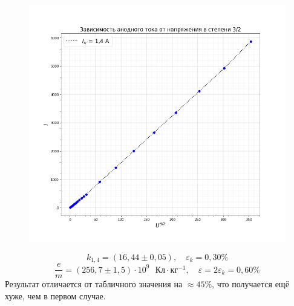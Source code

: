 \documentclass[a4paper,12pt]{article}
\begin{document}
\begin{figure}[H]\label{fig: I)(U^3/2) 1.4}
    \centering
    \includegraphics[width = \textwidth]{I(U pow (1,5))_14.png}
\end{figure}
\[k_{1,4} = (16,44 \pm 0,05), \quad \varepsilon_k = 0,30\% \]
\[\frac{e}{m} = (256,7 \pm 1,5) \cdot 10^{9} \text{ } Кл \cdot кг^{-1}, \quad \varepsilon = 2\varepsilon_k = 0,60\%\]
Результат отличается от табличного значения на $\approx 45\%$, что получается ещё хуже, чем в первом случае.
\end{document}
